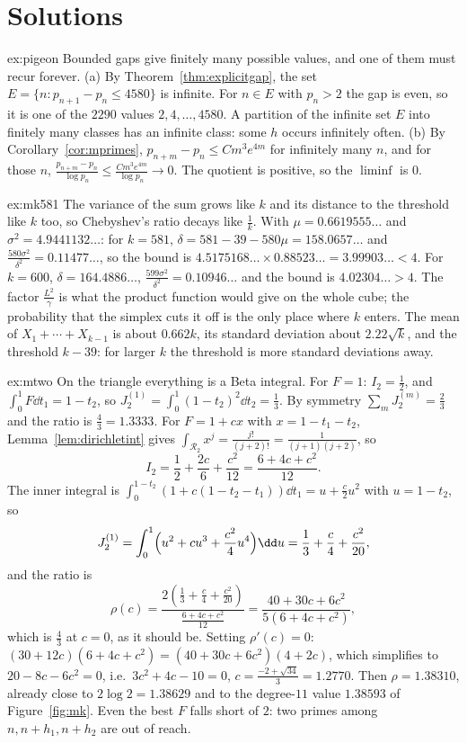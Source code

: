 \section{Solutions}

\begin{solution}{ex:pigeon}
\idea Bounded gaps give finitely many possible values, and one of them must recur forever.
\writeup (a) By Theorem~\ref{thm:explicitgap}, the set $E=\{n:p_{n+1}-p_n\le4580\}$ is infinite. For $n\in E$ with $p_n>2$ the gap is even, so it is one of the $2290$ values $2,4,\dots,4580$. A partition of the infinite set $E$ into finitely many classes has an infinite class: some $h$ occurs infinitely often.
(b) By Corollary~\ref{cor:mprimes}, $p_{n+m}-p_n\le Cm^3e^{4m}$ for infinitely many $n$, and for those $n$, $\frac{p_{n+m}-p_n}{\log p_n}\le\frac{Cm^3e^{4m}}{\log p_n}\to0$. The quotient is positive, so the $\liminf$ is $0$.
\end{solution}

\begin{solution}{ex:mk581}
\idea The variance of the sum grows like $k$ and its distance to the threshold like $k$ too, so Chebyshev's ratio decays like $\frac1k$.
\writeup With $\mu=0.6619555\ldots$ and $\sigma^2=4.9441132\ldots$: for $k=581$, $\delta=581-39-580\mu=158.0657\ldots$ and $\frac{580\sigma^2}{\delta^2}=0.11477\ldots$, so the bound is $4.5175168\ldots\times0.88523\ldots=3.99903\ldots<4$. For $k=600$, $\delta=164.4886\ldots$, $\frac{599\sigma^2}{\delta^2}=0.10946\ldots$ and the bound is $4.02304\ldots>4$. The factor $\frac{L^2}\gamma$ is what the product function would give on the whole cube; the probability that the simplex cuts it off is the only place where $k$ enters. The mean of $X_1+\cdots+X_{k-1}$ is about $0.662k$, its standard deviation about $2.22\sqrt k$, and the threshold $k-39$: for larger $k$ the threshold is more standard deviations away.
\end{solution}

\begin{solution}{ex:mtwo}
\idea On the triangle everything is a Beta integral.
\writeup For $F=1$: $I_2=\frac12$, and $\int_0^1F\dd t_1=1-t_2$, so $J_2^{(1)}=\int_0^1(1-t_2)^2\dd t_2=\frac13$. By symmetry $\sum_mJ_2^{(m)}=\frac23$ and the ratio is $\frac43=1.3333$. For $F=1+cx$ with $x=1-t_1-t_2$, Lemma~\ref{lem:dirichletint} gives $\int_{\mathcal R_2}x^j=\frac{j!}{(j+2)!}=\frac1{(j+1)(j+2)}$, so
\[
I_2=\frac12+\frac{2c}6+\frac{c^2}{12}=\frac{6+4c+c^2}{12}.
\]
The inner integral is $\int_0^{1-t_2}(1+c(1-t_2-t_1))\dd t_1=u+\frac c2u^2$ with $u=1-t_2$, so
\[
J_2^{(1)}=\int_0^1\Bigl(u^2+cu^3+\frac{c^2}4u^4\Bigr)\dd u=\frac13+\frac c4+\frac{c^2}{20},
\]
and the ratio is
\[
\rho(c)=\frac{2(\frac13+\frac c4+\frac{c^2}{20})}{\frac{6+4c+c^2}{12}}=\frac{40+30c+6c^2}{5(6+4c+c^2)},
\]
which is $\frac43$ at $c=0$, as it should be. Setting $\rho'(c)=0$: $(30+12c)(6+4c+c^2)=(40+30c+6c^2)(4+2c)$, which simplifies to $20-8c-6c^2=0$, i.e.\ $3c^2+4c-10=0$, $c=\frac{-2+\sqrt{34}}3=1.2770$. Then $\rho=1.38310$, already close to $2\log2=1.38629$ and to the degree-$11$ value $1.38593$ of Figure~\ref{fig:mk}. Even the best $F$ falls short of $2$: two primes among $n,n+h_1,n+h_2$ are out of reach.
\end{solution}

